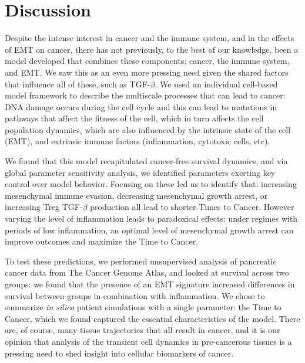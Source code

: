 \documentclass[11pt]{article}
\begin{document}
\section{Discussion}\label{Discussion}
Despite the intense interest in cancer and the immune system, and in the effects of EMT on cancer, there has not previously, to the best of our knowledge, been a model developed that combines these components: cancer, the immune system, and EMT. We saw this as an even more pressing need given the shared factors that influence all of these, such as TGF-$\beta$. We used an individual cell-based model framework to describe the multiscale processes that can lead to cancer: DNA damage occurs during the cell cycle and this can lead to mutations in pathways that affect the fitness of the cell, which in turn affects the cell population dynamics, which are also influenced by the intrinsic state of the cell (EMT), and extrinsic immune factors (inflammation, cytotoxic cells, etc).
\par
We found that this model recapitulated cancer-free survival dynamics, and via global parameter sensitivity analysis, we identified parameters exerting key control over model behavior. Focusing on these led us to identify that: increasing mesenchymal immune evasion, decreasing mesenchymal growth arrest, or increasing Treg TGF-$\beta$ production all lead to shorter Times to Cancer. However varying the level of inflammation leads to paradoxical effects: under regimes with periods of low inflammation, an optimal level of mesenchymal growth arrest can improve outcomes and maximize the Time to Cancer.
\par
To test these predictions, we performed unsupervised analysis of pancreatic cancer data from The Cancer Genome Atlas, and looked at survival across two groups: we found that the presence of an EMT signature increased differences in survival between groups in combination with inflammation. We chose to summarize {\em in silico} patient simulations with a single parameter: the Time to Cancer, which we found captured the essential characteristics of the model. There are, of course, many tissue trajectories that all result in cancer, and it is our opinion that analysis of the transient cell dynamics in pre-cancerous tissues is a pressing need to shed insight into cellular biomarkers of cancer.
\par

\end{document}
